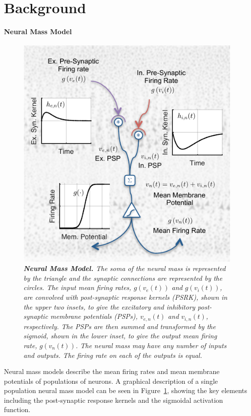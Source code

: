 \documentclass{article}
\begin{document}
\section{Background}
\label{sec:background}


\paragraph{Neural Mass Model}
\begin{figure}[ht]
  \begin{center}
    \includegraphics{./figures/pdf/SingleMass2.pdf}
  \end{center}
  \caption{\emph{\textbf{Neural Mass Model.} The soma of the neural mass is represented by the triangle and the synaptic connections are represented by the circles. The input mean firing rates, $g(v_{e}(t))$ and $g(v_{i}(t))$, are convolved with post-synaptic response kernels (PSRK), shown in the upper two insets, to give the excitatory and inhibitory post-synaptic membrane potentials (PSPs), $v_{e,n}(t)$ and $v_{i,n}(t)$, respectively. The PSPs are then summed and transformed by the sigmoid, shown in the lower inset, to give the output mean firing rate, $g(v_n(t))$. The neural mass may have any number of inputs and outputs. The firing rate on each of the outputs is equal.}}
  \label{fig:SingleNeuralMass}
\end{figure}
Neural mass models describe the mean firing rates and mean membrane potentials of populations of neurons. A graphical description of a single population neural mass model can be seen in Figure~\ref{fig:SingleNeuralMass}, showing the key elements including the post-synaptic response kernels and the sigmoidal activation function. 
\end{document}
